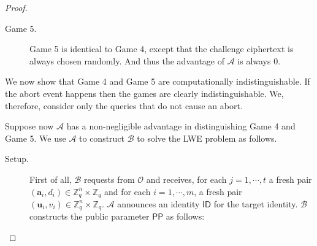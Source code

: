 \documentclass[runningheads]{llncs}
\def\ZZ{\mathbb{Z}}
\def\cal{\mathcal}
\def\bf{\mathbf}
\def\PP{\mathsf{PP}}
\def\u{\bf{u}}
\def\ID{\mathsf{ID}}
\begin{document}
\begin{proof}
\begin{description}
\item[Game 5.] Game 5 is identical to Game 4, except that the challenge ciphertext is always chosen randomly. And thus the advantage of $\cal{A}$ is always $0$.
\end{description}
We now show that Game 4 and Game 5 are computationally indistinguishable. If the abort event happens then the games are clearly indistinguishable. We, therefore, consider only the queries that do not cause an abort.

Suppose now $\cal{A}$ has a non-negligible advantage in distinguishing Game 4 and Game 5. We use $\cal{A}$ to construct $\cal{B}$ to solve the LWE problem as follows.
\begin{description}
\item[Setup.] First of all, $\cal{B}$ requests from $\cal{O}$ and receives, for each $j=1,\cdots, t$ a fresh pair $(\bf{a}_i,d_i)\in\ZZ_q^n\times\ZZ_q$ and for each $i=1,\cdots,m$, a fresh pair $(\u_i,v_i)\in\ZZ_q^n\times\ZZ_q$. $\cal{A}$ announces an identity $\ID$ for the target identity. $\cal{B}$  constructs the public parameter $\PP$ as follows:


\end{description}
\end{proof}
\end{document}
